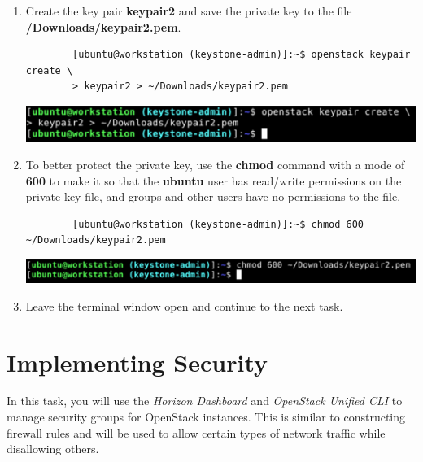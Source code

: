 \documentclass[letterpaper, 12pt]{article}
\begin{document}
\begin{enumerate}
    \item Create the key pair \textbf{keypair2} and save the private key to the file
    \textbf{\texttildemid/Downloads/keypair2.pem}.
    \begin{lstlisting}
        [ubuntu@workstation (keystone-admin)]:~$ openstack keypair create \
        > keypair2 > ~/Downloads/keypair2.pem
    \end{lstlisting}

    \begin{center}
        \includegraphics[width=\linewidth]{images/part4/step7.png}
    \end{center}

    \item To better protect the private key, use the \textbf{chmod} command with a mode of \textbf{600} to make it so that the \textbf{ubuntu} user has read/write permissions on the private key file, and groups and other users have no permissions to the file.
    \begin{lstlisting}
        [ubuntu@workstation (keystone-admin)]:~$ chmod 600 ~/Downloads/keypair2.pem
    \end{lstlisting}

    \begin{center}
        \includegraphics[width=\linewidth]{images/part4/step8.png}
    \end{center}

    \item Leave the terminal window open and continue to the next task.

\end{enumerate}

\section{Implementing Security}
\label{sec:implementing_security}
In this task, you will use the \textit{Horizon Dashboard} and \textit{OpenStack Unified CLI} to manage security groups for OpenStack instances.
This is similar to constructing firewall rules and will be used to allow certain types of network traffic while disallowing others.
\end{document}
